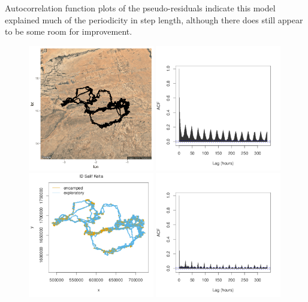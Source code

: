\documentclass[12pt]{article}\usepackage[]{graphicx}\usepackage[]{xcolor}
\begin{document}
Autocorrelation function plots of the pseudo-residuals indicate this model explained much of the periodicity in step length, although there does still appear to be some room for improvement.

\begin{figure}[htbp]
  \includegraphics[width=0.49\textwidth]{elephant_plotSat.png}
  \includegraphics[width=0.49\textwidth]{plot_elephantResults017.pdf}
  \includegraphics[width=0.49\textwidth]{plot_elephantResults015.pdf}
  \includegraphics[width=0.49\textwidth]{plot_elephantResults016.pdf}

\end{figure}
\end{document}
